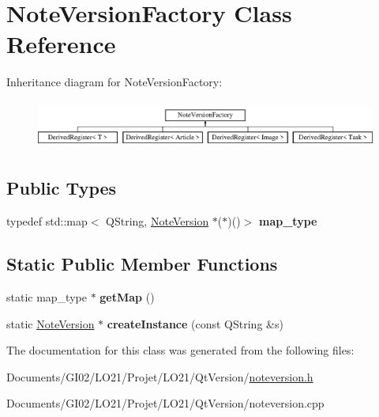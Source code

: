 \hypertarget{class_note_version_factory}{}\section{Note\+Version\+Factory Class Reference}
\label{class_note_version_factory}
Inheritance diagram for Note\+Version\+Factory\+:\begin{figure}[H]
\begin{center}
\leavevmode
\includegraphics[height=1.627907cm]{class_note_version_factory}
\end{center}
\end{figure}
\subsection*{Public Types}
\begin{DoxyCompactItemize}
\item 
\mbox{\label{class_note_version_factory_a5ee840b77e479136a07806129c4c90ef}} 
typedef std\+::map$<$ Q\+String, \hyperlink{class_note_version}{Note\+Version} $\ast$($\ast$)()$>$ {\bfseries map\+\_\+type}
\end{DoxyCompactItemize}
\subsection*{Static Public Member Functions}
\begin{DoxyCompactItemize}
\item 
\mbox{\label{class_note_version_factory_a4d4f158a1bf99ff9d88a4008ea7a31db}} 
static map\+\_\+type $\ast$ {\bfseries get\+Map} ()
\item 
\mbox{\label{class_note_version_factory_a332c745461441d4174608430789b5838}} 
static \hyperlink{class_note_version}{Note\+Version} $\ast$ {\bfseries create\+Instance} (const Q\+String \&s)
\end{DoxyCompactItemize}


The documentation for this class was generated from the following files\+:\begin{DoxyCompactItemize}
\item 
Documents/\+G\+I02/\+L\+O21/\+Projet/\+L\+O21/\+Qt\+Version/\hyperlink{noteversion_8h}{noteversion.\+h}\item 
Documents/\+G\+I02/\+L\+O21/\+Projet/\+L\+O21/\+Qt\+Version/noteversion.\+cpp\end{DoxyCompactItemize}
